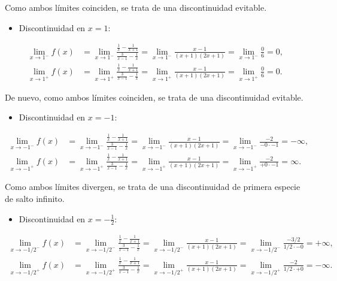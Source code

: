 \documentclass[
  a4paper,
]{scrreport}
\providecommand{\tightlist}{%
  \setlength{\itemsep}{0pt}\setlength{\parskip}{0pt}}\usepackage{longtable,booktabs,array}
\theoremstyle{definition}
\theoremstyle{remark}
\begin{document}
\begin{tcolorbox}
\begin{enumerate}
  Como ambos límites coinciden, se trata de una discontinuidad evitable.

  \begin{itemize}
  \tightlist
  \item
    Discontinuidad en \(x=1\):
  \end{itemize}

  \begin{align*}
   \lim_{x\rightarrow 1^{-}}f(x) &= \lim_{x\rightarrow 1^{-}}\frac{\frac{1}{x}-\frac{1}{x+1}}{\frac{3}{x-1}-\frac{1}{x}} = \lim_{x\rightarrow 1^{-}}\frac{x-1}{\left( x+1\right) \left( 2x+1\right) } = \lim_{x\rightarrow 1^{-}}\frac{0}{6}=0, \\
   \lim_{x\rightarrow 1^{+}}f(x) &= \lim_{x\rightarrow 1^{+}}\frac{\frac{1}{x}-\frac{1}{x+1}}{\frac{3}{x-1}-\frac{1}{x}} = \lim_{x\rightarrow 1^{+}}\frac{x-1}{\left( x+1\right) \left( 2x+1\right) } = \lim_{x\rightarrow 1^{+}}\frac{0}{6}=0.
   \end{align*}

  De nuevo, como ambos límites coinciden, se trata de una discontinuidad
  evitable.

  \begin{itemize}
  \tightlist
  \item
    Discontinuidad en \(x=-1\):
  \end{itemize}

  \begin{align*}
   \lim_{x\rightarrow -1^{-}}f(x) &= \lim_{x\rightarrow -1^{-}}\frac{\frac{1}{x}-\frac{1}{x+1}}{\frac{3}{x-1}-\frac{1}{x}} = \lim_{x\rightarrow -1^{-}}\frac{x-1}{\left( x+1\right) \left( 2x+1\right) } = \lim_{x\rightarrow -1^{-}}\frac{-2}{-0\cdot -1}=-\infty, \\
   \lim_{x\rightarrow -1^{+}}f(x) &= \lim_{x\rightarrow -1^{+}}\frac{\frac{1}{x}-\frac{1}{x+1}}{\frac{3}{x-1}-\frac{1}{x}} = \lim_{x\rightarrow -1^{+}}\frac{x-1}{\left( x+1\right) \left( 2x+1\right) } = \lim_{x\rightarrow -1^{+}}\frac{-2}{+0\cdot -1}=\infty.
   \end{align*}

  Como ambos límites divergen, se trata de una discontinuidad de primera
  especie de salto infinito.

  \begin{itemize}
  \tightlist
  \item
    Discontinuidad en \(x=-\frac{1}{2}\):
  \end{itemize}

  \begin{align*}
   \lim_{x\rightarrow -1/2^{-}}f(x) &= \lim_{x\rightarrow -1/2^{-}}\frac{\frac{1}{x}-\frac{1}{x+1}}{\frac{3}{x-1}-\frac{1}{x}} = \lim_{x\rightarrow -1/2^{-}}\frac{x-1}{\left( x+1\right) \left( 2x+1\right) } = \lim_{x\rightarrow-1/2^{-}}\frac{-3/2}{1/2\cdot -0} = +\infty, \\
   \lim_{x\rightarrow -1/2^{+}}f(x) &= \lim_{x\rightarrow -1/2^{+}}\frac{\frac{1}{x}-\frac{1}{x+1}}{\frac{3}{x-1}-\frac{1}{x}} = \lim_{x\rightarrow -1/2^{+}}\frac{x-1}{\left( x+1\right) \left( 2x+1\right) } = \lim_{x\rightarrow-1/2^{+}}\frac{-2}{1/2\cdot +0} = -\infty.
   \end{align*}


\end{enumerate}
\end{tcolorbox}
\end{document}
